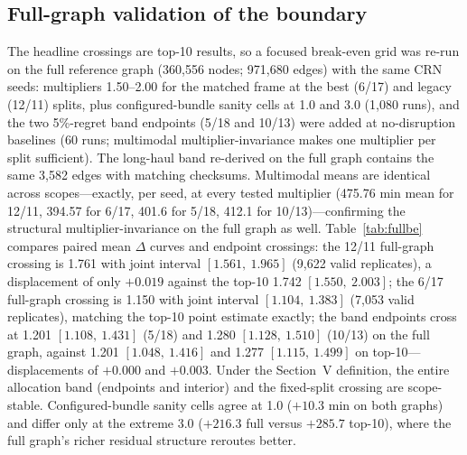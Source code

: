 \documentclass{ieeeaccess}
\begin{document}
\subsection{Full-graph validation of the boundary}
The headline crossings are top-10 results, so a focused break-even grid was re-run on the full reference graph (360{,}556 nodes; 971{,}680 edges) with the same CRN seeds: multipliers 1.50--2.00 for the matched frame at the best (6/17) and legacy (12/11) splits, plus configured-bundle sanity cells at 1.0 and 3.0 (1{,}080 runs), and the two 5\%-regret band endpoints (5/18 and 10/13) were added at no-disruption baselines (60 runs; multimodal multiplier-invariance makes one multiplier per split sufficient). The long-haul band re-derived on the full graph contains the same 3{,}582 edges with matching checksums. Multimodal means are identical across scopes---exactly, per seed, at every tested multiplier (475.76 min mean for 12/11, 394.57 for 6/17, 401.6 for 5/18, 412.1 for 10/13)---confirming the structural multiplier-invariance on the full graph as well. Table~\ref{tab:fullbe} compares paired mean $\Delta$ curves and endpoint crossings: the 12/11 full-graph crossing is 1.761 with joint interval $[1.561,\ 1.965]$ (9{,}622 valid replicates), a displacement of only $+0.019$ against the top-10 1.742 $[1.550,\ 2.003]$; the 6/17 full-graph crossing is 1.150 with joint interval $[1.104,\ 1.383]$ (7{,}053 valid replicates), matching the top-10 point estimate exactly; the band endpoints cross at 1.201 $[1.108,\ 1.431]$ (5/18) and 1.280 $[1.128,\ 1.510]$ (10/13) on the full graph, against 1.201 $[1.048,\ 1.416]$ and 1.277 $[1.115,\ 1.499]$ on top-10---displacements of $+0.000$ and $+0.003$. Under the Section~V definition, the entire allocation band (endpoints and interior) and the fixed-split crossing are scope-stable. Configured-bundle sanity cells agree at 1.0 ($+10.3$ min on both graphs) and differ only at the extreme 3.0 ($+216.3$ full versus $+285.7$ top-10), where the full graph's richer residual structure reroutes better.
\end{document}
